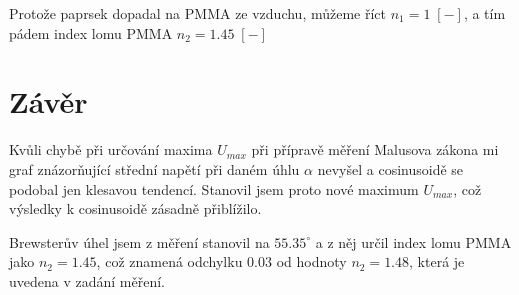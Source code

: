 \documentclass{article}
\begin{document}
\begin{figure}[H]
\begin{minipage}[t]{0.5\textwidth}
    \end{minipage}
\end{figure}
Protože paprsek dopadal na PMMA ze vzduchu, můžeme říct \(n_1 = 1\;[-]\), a tím pádem index lomu PMMA \(n_2 = 1.45\;[-]\)

\section{Závěr}
Kvůli chybě při určování maxima \(U_{max}\) při přípravě měření Malusova zákona mi graf znázorňující střední napětí při daném úhlu \(\alpha\) nevyšel a cosinusoidě se podobal jen klesavou tendencí.
Stanovil jsem proto nové maximum \(U_{max}\), což výsledky k cosinusoidě zásadně přiblížilo.

Brewsterův úhel jsem z měření stanovil na \(55.35^\circ\) a z něj určil index lomu PMMA jako \(n_2 = 1.45\), což znamená odchylku \(0.03\) od hodnoty \(n_2 = 1.48\), která je uvedena v zadání měření. 
\end{document}
